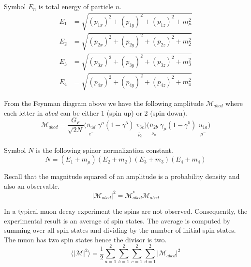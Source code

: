 \documentclass[12pt]{article}
\begin{document}
\noindent
Symbol $E_n$ is total energy of particle $n$.
\begin{align*}
E_1&=\sqrt{(p_{1x})^2+(p_{1y})^2+(p_{1z})^2+m_\mu^2}
\\
E_2&=\sqrt{(p_{2x})^2+(p_{2y})^2+(p_{2z})^2+m_2^2}
\\
E_3&=\sqrt{(p_{3x})^2+(p_{3y})^2+(p_{3z})^2+m_3^2}
\\
E_4&=\sqrt{(p_{4x})^2+(p_{4y})^2+(p_{4z})^2+m_4^2}
\end{align*}

\noindent
From the Feynman diagram above we have the following amplitude $\mathcal{M}_{abcd}$
where each letter in $abcd$ can be either 1 (spin up) or 2 (spin down).
\begin{equation*}
\mathcal{M}_{abcd}=\frac{G_F}{\sqrt{2N}}
\big(
\underset{\substack{\\[1ex]e^-}}{\bar{u}_{4d}}
\;
\underset{\substack{\\[1ex] }}{\gamma^\mu(1-\gamma^5)}
\;
\underset{\substack{\\[1ex]\bar{\nu}_e}}{v_{3c}}
\big)
\big(
\underset{\substack{\\[1ex]\nu_\mu}}{\bar{u}_{2b}}
\;
\underset{\substack{\\[1ex] }}{\gamma_\mu(1-\gamma^5)}
\;
\underset{\substack{\\[1ex]\mu^-}}{u_{1a}}
\big)
\end{equation*}

\noindent
Symbol $N$ is the following spinor normalization constant.
\begin{equation*}
N=(E_1+m_\mu)(E_2+m_2)(E_3+m_3)(E_4+m_4)
\end{equation*}

\noindent
Recall that the magnitude squared of an amplitude is a probability density and also an observable.
\begin{equation*}
|\mathcal{M}_{abcd}|^2=\mathcal{M}_{abcd}^*\mathcal{M}_{abcd}
\end{equation*}

\noindent
In a typical muon decay experiment the spins are not observed.
Consequently, the experimental result is an average of spin states.
The average is computed by summing over all spin states and dividing by the number of initial spin states.
The muon has two spin states hence the divisor is two.
\begin{equation*}
\langle|\mathcal{M}|^2\rangle=
\frac{1}{2}
\sum_{a=1}^2\sum_{b=1}^2\sum_{c=1}^2\sum_{d=1}^2
|\mathcal{M}_{abcd}|^2
\end{equation*}
\end{document}
